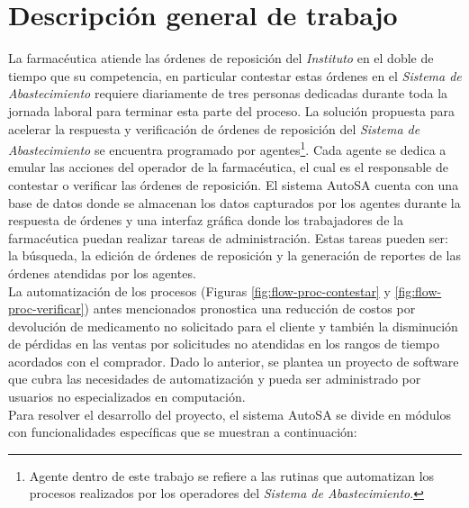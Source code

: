 \section{Descripción general de trabajo}\label{sec:desc-general}
La farmacéutica atiende las órdenes de reposición del \textit{Instituto} en el doble de tiempo que su competencia, en particular contestar estas órdenes en el \textit{Sistema de Abastecimiento} requiere diariamente de tres personas dedicadas durante toda la jornada laboral para terminar esta parte del proceso. La solución propuesta para acelerar la respuesta y verificación de órdenes de reposición del \textit{Sistema de Abastecimiento} se encuentra programado por agentes\footnote{Agente dentro de este trabajo se refiere a las rutinas que automatizan los procesos realizados por los operadores del \textit{Sistema de Abastecimiento}.}. Cada agente se dedica a emular las acciones del operador de la farmacéutica, el cual es el responsable de contestar o verificar las órdenes de reposición. El sistema AutoSA cuenta con una base de datos donde se almacenan los datos capturados por los agentes durante la respuesta de órdenes y una interfaz gráfica donde los trabajadores de la farmacéutica puedan realizar tareas de administración. Estas tareas pueden ser: la búsqueda, la edición de órdenes de reposición y la generación de reportes de las órdenes atendidas por los agentes.\\
La automatización de los procesos (Figuras \ref{fig:flow-proc-contestar} y \ref{fig:flow-proc-verificar}) antes mencionados pronostica una reducción de costos por devolución de medicamento no solicitado para el cliente y también la disminución de pérdidas en las ventas por solicitudes no atendidas en los rangos de tiempo acordados con el comprador. Dado lo anterior, se plantea un proyecto de software que cubra las necesidades de automatización y pueda ser administrado por usuarios no especializados en computación.\\
Para resolver el desarrollo del proyecto, el sistema AutoSA se divide en módulos con funcionalidades específicas que se muestran a continuación:
